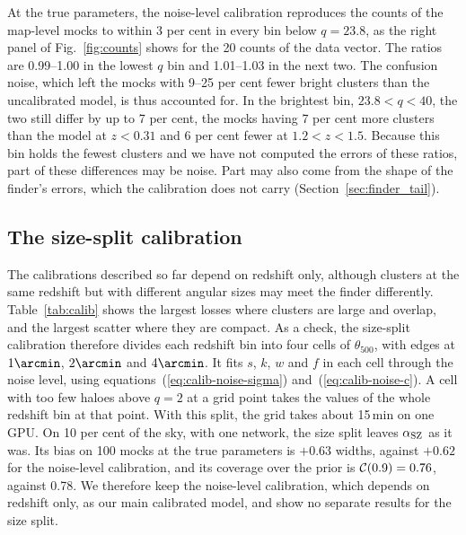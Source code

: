At the true parameters, the noise-level calibration reproduces the counts of the map-level mocks to within 3
per cent in every bin below $q = 23.8$, as the right panel of Fig.~\ref{fig:counts} shows for the 20 counts of
the data vector. The ratios are 0.99--1.00 in the lowest $q$ bin and 1.01--1.03 in the next two. The confusion
noise, which left the mocks with 9--25 per cent fewer bright clusters than the uncalibrated model, is thus
accounted for. In the brightest bin, $23.8 < q < 40$, the two still differ by up to 7 per cent, the mocks having
7 per cent more clusters than the model at $z < 0.31$ and 6 per cent fewer at $1.2 < z < 1.5$. Because this
bin holds the fewest clusters and we have not computed the errors of these ratios, part of these differences may be noise. Part may also come from the shape of the finder's errors, which the calibration does not carry
(Section~\ref{sec:finder_tail}).

\subsection{The size-split calibration}\label{sec:calib-size}

The calibrations described so far depend on redshift only, although clusters at the same redshift but with
different angular sizes may meet the finder differently. Table~\ref{tab:calib} shows the largest losses
where clusters are large and overlap, and the largest scatter where they are compact. As a check,
the size-split calibration therefore divides each redshift bin into four cells of $\theta_{500}$, with edges at
$1\arcmin$, $2\arcmin$ and $4\arcmin$. It fits $s$, $k$, $w$ and $f$ in each cell through the noise level,
using equations~(\ref{eq:calib-noise-sigma}) and~(\ref{eq:calib-noise-c}). A cell with too few haloes above
$q = 2$ at a grid point takes the values of the whole redshift bin at that point. With this split, the grid takes about
15\,min on one GPU. On 10 per cent of the sky, with one network, the size split leaves $\alpha_\mathrm{SZ}$ as it was. Its
bias on 100 mocks at the true parameters is $+0.63$ widths, against $+0.62$ for the noise-level
calibration, and its coverage over the prior is $\mathcal{C}(0.9) = 0.76$, against 0.78. We therefore keep the
noise-level calibration, which depends on redshift only, as our main calibrated model, and show no separate
results for the size split.

